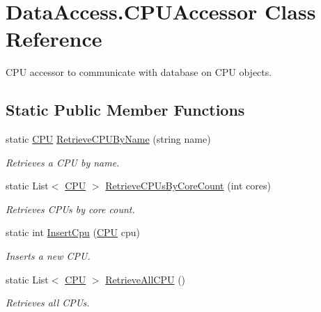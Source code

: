 \hypertarget{class_data_access_1_1_c_p_u_accessor}{}\section{Data\+Access.\+C\+P\+U\+Accessor Class Reference}
\label{class_data_access_1_1_c_p_u_accessor}


C\+PU accessor to communicate with database on C\+PU objects.  


\subsection*{Static Public Member Functions}
\begin{DoxyCompactItemize}
\item 
static \hyperlink{class_business_objects_1_1_c_p_u}{C\+PU} \hyperlink{class_data_access_1_1_c_p_u_accessor_a92d43c1a282b8bbaf39e48514f9a54e7}{Retrieve\+C\+P\+U\+By\+Name} (string name)
\begin{DoxyCompactList}\small\item\em Retrieves a C\+PU by name. \end{DoxyCompactList}\item 
static List$<$ \hyperlink{class_business_objects_1_1_c_p_u}{C\+PU} $>$ \hyperlink{class_data_access_1_1_c_p_u_accessor_a07c977d60ddb3c98a6de06c2b74f3129}{Retrieve\+C\+P\+Us\+By\+Core\+Count} (int cores)
\begin{DoxyCompactList}\small\item\em Retrieves C\+P\+Us by core count. \end{DoxyCompactList}\item 
static int \hyperlink{class_data_access_1_1_c_p_u_accessor_a3bdc9307783a16d68413e856e2be24ee}{Insert\+Cpu} (\hyperlink{class_business_objects_1_1_c_p_u}{C\+PU} cpu)
\begin{DoxyCompactList}\small\item\em Inserts a new C\+PU. \end{DoxyCompactList}\item 
static List$<$ \hyperlink{class_business_objects_1_1_c_p_u}{C\+PU} $>$ \hyperlink{class_data_access_1_1_c_p_u_accessor_af33b1affd73312b1cad5637dd2f66aec}{Retrieve\+All\+C\+PU} ()
\begin{DoxyCompactList}\small\item\em Retrieves all C\+P\+Us. \end{DoxyCompactList}\end{DoxyCompactItemize}



